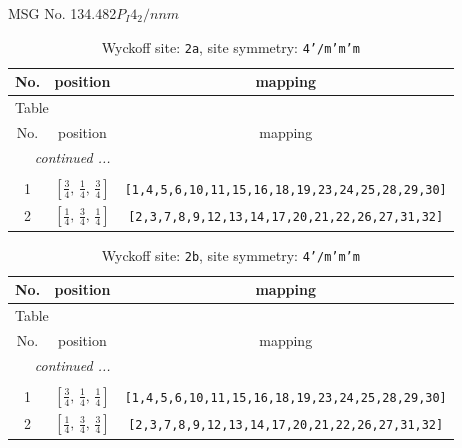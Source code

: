 \documentclass[fleqn,8pt]{jsarticle}
\begin{document}
\setcounter{MaxMatrixCols}{32}

\renewcommand{\tablename}{Table~}
\renewcommand{\figurename}{Figure~}
\begin{center}
\LARGE
MSG No. 134.482\quad$P_{I}4_{2}/nnm$
\end{center}
\renewcommand{\arraystretch}{1.2}
\begin{longtable}{ccc}
\caption{Wyckoff site: {\tt 2a}, site symmetry: {\tt 4'/m'm'm}}
 \\
 \hline \hline
No. & position & mapping \\ \hline \endfirsthead

\multicolumn{2}{l}{\tablename\ \thetable{}} \\
 \hline \hline
No. & position & mapping \\ \hline \endhead

 \hline \hline
\multicolumn{2}{r}{\footnotesize\it continued ...} \\ \endfoot

 \hline \hline
\multicolumn{2}{r}{} \\ \endlastfoot

1 & $\left[ \frac{3}{4},\, \frac{1}{4},\, \frac{3}{4} \right]$ & {\tt [1,4,5,6,10,11,15,16,18,19,23,24,25,28,29,30]} \\ \hline
2 & $\left[ \frac{1}{4},\, \frac{3}{4},\, \frac{1}{4} \right]$ & {\tt [2,3,7,8,9,12,13,14,17,20,21,22,26,27,31,32]} \\
\end{longtable}
\renewcommand{\arraystretch}{1.2}
\begin{longtable}{ccc}
\caption{Wyckoff site: {\tt 2b}, site symmetry: {\tt 4'/m'm'm}}
 \\
 \hline \hline
No. & position & mapping \\ \hline \endfirsthead

\multicolumn{2}{l}{\tablename\ \thetable{}} \\
 \hline \hline
No. & position & mapping \\ \hline \endhead

 \hline \hline
\multicolumn{2}{r}{\footnotesize\it continued ...} \\ \endfoot

 \hline \hline
\multicolumn{2}{r}{} \\ \endlastfoot

1 & $\left[ \frac{3}{4},\, \frac{1}{4},\, \frac{1}{4} \right]$ & {\tt [1,4,5,6,10,11,15,16,18,19,23,24,25,28,29,30]} \\ \hline
2 & $\left[ \frac{1}{4},\, \frac{3}{4},\, \frac{3}{4} \right]$ & {\tt [2,3,7,8,9,12,13,14,17,20,21,22,26,27,31,32]} \\
\end{longtable}
\end{document}
